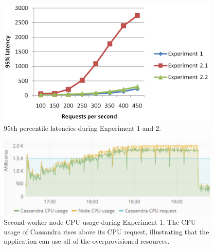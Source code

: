 \begin{figure}
\centering
\includegraphics[width=0.75\columnwidth]{Images/Experiments/CPU/Latencies/lat-exp1-2.PNG}
\caption{95th percentile latencies during Experiment 1 and 2.}
\label{fig:lat-cas-li} 
\end{figure}

\begin{figure}
\centering
\includegraphics[width=0.80\columnwidth]{Images/Experiments/CPU/Grafana/cpu-cas-li.PNG}
\caption{Second worker node CPU usage during Experiment 1. The CPU usage of Cassandra rises above its CPU request, illustrating that the application can use all of the overprovisioned resources.}
\label{fig:cpu-cas-li} 
\end{figure}

%

